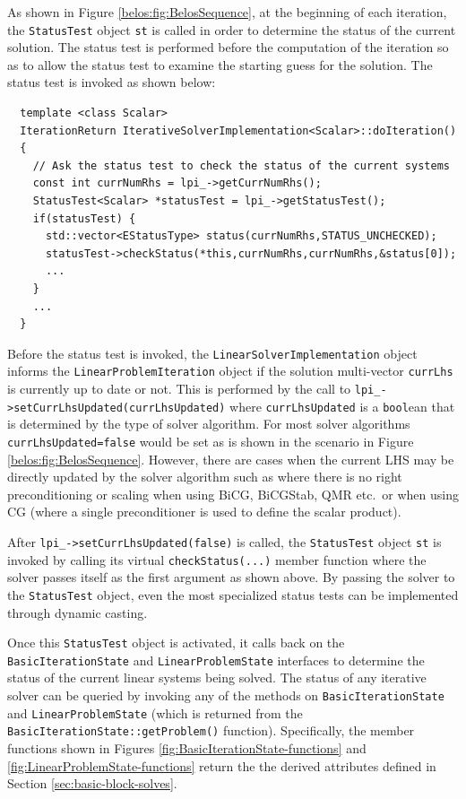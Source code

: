 \documentclass[pdf,ps2pdf,11pt]{SANDreport}
\begin{document}
\begin{enumerate}
As shown in Figure {}\ref{belos:fig:BelosSequence}, at the beginning
of each iteration, the {}\texttt{Status\-Test} object {}\texttt{st} is
called in order to determine the status of the current solution.  The
status test is performed before the computation of the iteration so as
to allow the status test to examine the starting guess for the
solution.  The status test is invoked as shown below:

{\scriptsize\begin{verbatim}
  template <class Scalar>
  IterationReturn IterativeSolverImplementation<Scalar>::doIteration()
  {
    // Ask the status test to check the status of the current systems
    const int currNumRhs = lpi_->getCurrNumRhs();
    StatusTest<Scalar> *statusTest = lpi_->getStatusTest();
    if(statusTest) {
      std::vector<EStatusType> status(currNumRhs,STATUS_UNCHECKED);
      statusTest->checkStatus(*this,currNumRhs,currNumRhs,&status[0]);
      ...
    }
    ...
  }
\end{verbatim}}

Before the status test is invoked, the
{}\texttt{Linear\-Solver\-Implementation} object informs the
{}\texttt{Linear\-Problem\-Iteration} object if the solution
multi-vector {}\texttt{currLhs} is currently up to date or not.  This
is performed by the call to
{}\texttt{lpi\_->\-set\-Curr\-Lhs\-Updated(\-curr\-Lhs\-Updated\-)}
where {}\texttt{curr\-Lhs\-Updated} is a {}\texttt{bool}ean that is
determined by the type of solver algorithm.  For most solver
algorithms {}\texttt{curr\-Lhs\-Updated=false} would be set as is
shown in the scenario in Figure {}\ref{belos:fig:BelosSequence}.
However, there are cases when the current LHS may be directly updated
by the solver algorithm such as where there is no right
preconditioning or scaling when using BiCG, BiCGStab, QMR etc.~or when
using CG (where a single preconditioner is used to define the scalar
product).

After
{}\texttt{lpi\_->\-set\-Curr\-Lhs\-Updated(\-false\-)} is
called, the {}\texttt{Status\-Test} object {}\texttt{st} is invoked by
calling its virtual {}\texttt{checkStatus(...)} member function where
the solver passes itself as the first argument as shown above. By
passing the solver to the {}\texttt{Status\-Test} object, even the
most specialized status tests can be implemented through dynamic
casting.

Once this {}\texttt{Status\-Test} object is activated, it calls back
on the {}\texttt{Basic\-Iteration\-State} and
{}\texttt{Linear\-Problem\-State} interfaces to determine the status
of the current linear systems being solved.  The status of any
iterative solver can be queried by invoking any of the methods on
{}\texttt{Basic\-Iteration\-State} and
{}\texttt{Linear\-Problem\-State} (which is returned from the
{}\texttt{Basic\-Iteration\-State\-::get\-Problem()} function).
Specifically, the member functions shown in Figures
{}\ref{fig:BasicIterationState-functions} and
{}\ref{fig:LinearProblemState-functions} return the the derived
attributes defined in Section {}\ref{sec:basic-block-solves}.


\end{enumerate}
\end{document}
